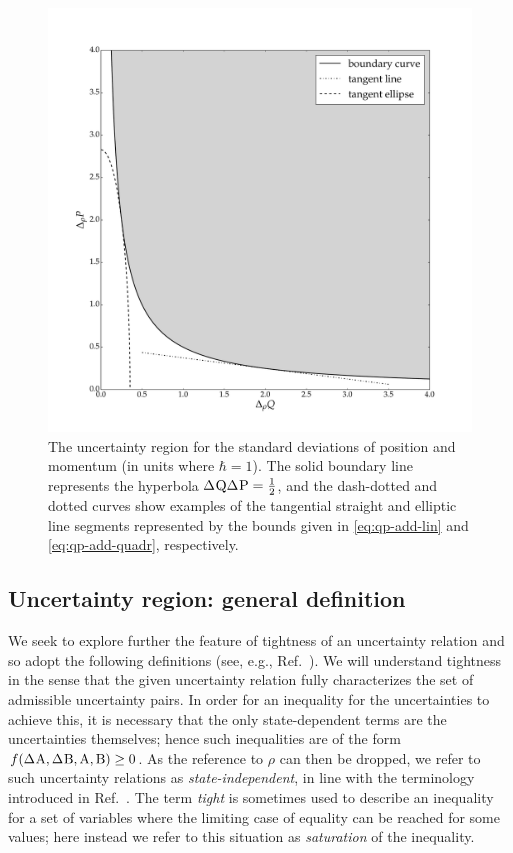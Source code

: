   \begin{figure}[ht]\centering
    \includegraphics[width=\textwidth]{figs/qp-error-region}
    \caption[The uncertainty region for the standard deviations of position and momentum.]{The uncertainty region for the standard deviations of position and momentum (in units where $\hbar = 1$). The solid boundary line represents the hyperbola $\sdev{\opq}\sdev{\opp}=\frac{1}{2}$, and the dash-dotted and dotted curves show examples of the tangential straight and elliptic line segments represented by the bounds given in \eqref{eq:qp-add-lin} and \eqref{eq:qp-add-quadr}, respectively.}\label{fig:QP-UR}
  \end{figure}


\subsection{Uncertainty region: general definition}\label{sec:pur-def}
We seek to explore further the feature of tightness of an uncertainty relation  and so adopt the following definitions (see, e.g., Ref.~\cite{AbbottAlzieuHallBranciard2016}).
We will understand tightness in the sense that the given uncertainty relation fully characterizes the set of admissible uncertainty pairs. In order for an inequality for the uncertainties to achieve this, it is necessary that the only state-dependent terms are the uncertainties themselves; hence such inequalities are of the form $f(\sdev{\opa},\sdev{\opb}, \opa,\opb)\ge 0$. As the reference to $\rho$ can then be dropped, we refer to such uncertainty relations as {\em state-independent}, in line with the terminology introduced in  Ref.~\cite{AbbottAlzieuHallBranciard2016}.
The term {\em tight} is sometimes used to describe an inequality for a set of variables where the limiting case of equality can be reached for some values; here instead we refer to this situation as {\em saturation} of the inequality. 


